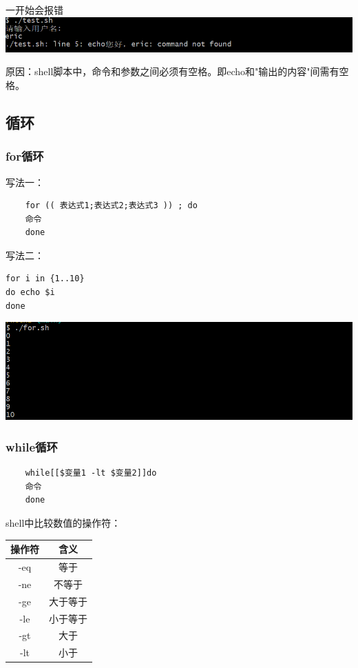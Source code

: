 \documentclass[UTF8,a4paper]{ctexart}
\begin{document}
一开始会报错\\
\includegraphics[width=1\textwidth]{./pictures/变量输入输出2.png}\par
原因：shell脚本中，命令和参数之间必须有空格。即echo和"输出的内容"间需有空格。

\subsection{循环}
\subsubsection{for循环}
写法一：
\begin{lstlisting}
    for (( 表达式1;表达式2;表达式3 )) ; do
    命令
    done
\end{lstlisting}

写法二：
\begin{lstlisting}
for i in {1..10}
do echo $i 
done
\end{lstlisting}
\includegraphics[width=1\textwidth]{./pictures/for2.png}\par

\subsubsection{while循环}
\begin{lstlisting}
    while[[$变量1 -lt $变量2]]do
    命令
    done
\end{lstlisting}
shell中比较数值的操作符：
\begin{table}[H]
    \centering
    \begin{tabular}{|c|c|}
        \hline
        操作符 & 含义\\
        \hline
        -eq & 等于\\
        \hline
        -ne & 不等于\\
        \hline
        -ge & 大于等于\\
        \hline
        -le & 小于等于\\
        \hline
        -gt & 大于\\
        \hline
        -lt & 小于\\
        \hline
    \end{tabular}
\end{table}
\end{document}
